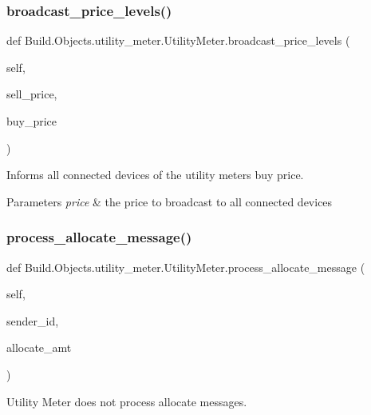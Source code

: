 \subsubsection{\texorpdfstring{broadcast\+\_\+price\+\_\+levels()}{broadcast\_price\_levels()}}
{\footnotesize\ttfamily def Build.\+Objects.\+utility\+\_\+meter.\+Utility\+Meter.\+broadcast\+\_\+price\+\_\+levels (\begin{DoxyParamCaption}\item[{}]{self,  }\item[{}]{sell\+\_\+price,  }\item[{}]{buy\+\_\+price }\end{DoxyParamCaption})}



Informs all connected devices of the utility meter\textquotesingle{}s buy price. 


\begin{DoxyParams}{Parameters}
{\em price} & the price to broadcast to all connected devices \\
\hline
\end{DoxyParams}
\mbox{\label{class_build_1_1_objects_1_1utility__meter_1_1_utility_meter_a8b7c3c518352e0a41555a1a9e70b460c}} 
\subsubsection{\texorpdfstring{process\+\_\+allocate\+\_\+message()}{process\_allocate\_message()}}
{\footnotesize\ttfamily def Build.\+Objects.\+utility\+\_\+meter.\+Utility\+Meter.\+process\+\_\+allocate\+\_\+message (\begin{DoxyParamCaption}\item[{}]{self,  }\item[{}]{sender\+\_\+id,  }\item[{}]{allocate\+\_\+amt }\end{DoxyParamCaption})}



Utility Meter does not process allocate messages. 


